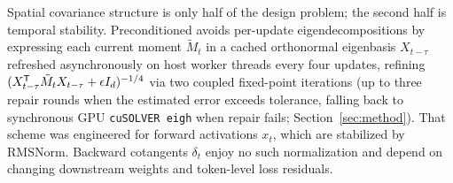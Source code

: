 Spatial covariance structure is only half of the design problem; the second half
is temporal stability. Preconditioned \muont{} avoids per-update
eigendecompositions by expressing each current moment $\tilde M_t$ in a cached
orthonormal eigenbasis $X_{t-\tau}$ refreshed asynchronously on host worker
threads every four updates, refining $(X_{t-\tau}^{{\mathsf T}}\tilde M_t X_{t-\tau} + \epsilon I_d)^{-1/4}$
via two coupled fixed-point iterations (up to three repair rounds when the
estimated error exceeds tolerance, falling back to synchronous GPU
\texttt{cuSOLVER eigh} when repair fails; Section~\ref{sec:method}). That scheme
was engineered for forward activations $x_t$, which are stabilized by RMSNorm.
Backward cotangents $\delta_t$ enjoy no such normalization and depend on
changing downstream weights and token-level loss residuals.

